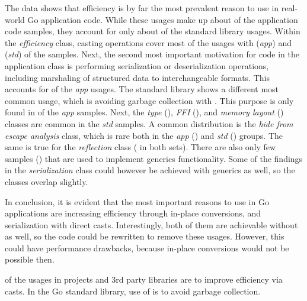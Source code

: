 

The data shows that efficiency is by far the most prevalent reason to use \unsafe{} in real-world Go application code.
While these usages make up about  of the application code samples, they account for only about
 of the standard library usages.
Within the \textit{efficiency} class, casting operations cover most of the usages with  (\textit{app})
and  (\textit{std}) of the samples.
Next, the second most important motivation for \unsafe{} code in the application class is performing serialization or
deserialization operations, including marshaling of structured data to interchangeable formats.
This accounts for  of the \textit{app} usages.
The standard library shows a different most common usage, which is avoiding garbage collection with .
This purpose is only found in  of the \textit{app} samples.
Next, the \textit{type} (), \textit{\acrshort{FFI}} (), and \textit{memory layout}
() classes are common in the \textit{std} samples.
A common distribution is the \textit{hide from escape analysis} class, which is rare both in the \textit{app}
() and \textit{std} () groups.
The same is true for the \textit{reflection} class ( in both sets).
There are also only few samples () that are used to implement generics functionality.
Some of the findings in the \textit{serialization} class could however be achieved with generics as well, so the classes
overlap slightly.

In conclusion, it is evident that the most important reasons to use \unsafe{} in Go applications are increasing
efficiency through in-place conversions, and serialization with direct casts.
Interestingly, both of them are achievable without \unsafe{} as well, so the code could be rewritten to remove these
usages.
However, this could have performance drawbacks, because in-place conversions would not be possible then.

\begin{answerToRQ}[\ref{rq:purpose}]
     of the \unsafe{} usages in projects and 3rd party libraries are to improve efficiency via
    \unsafe{} casts.
    In the Go standard library,  use of \unsafe{} is to avoid garbage collection.
\end{answerToRQ}



